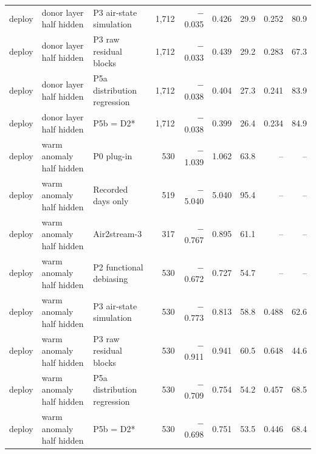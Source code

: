\begin{table}
{\begin{tabular}{lllrrrrrr}
deploy & donor layer half hidden & P3 air-state simulation & 1{,}712 & \ensuremath{-}0.035 & 0.426 & 29.9 & 0.252 & 80.9 \\
deploy & donor layer half hidden & P3 raw residual blocks & 1{,}712 & \ensuremath{-}0.033 & 0.439 & 29.2 & 0.283 & 67.3 \\
deploy & donor layer half hidden & P5a distribution regression & 1{,}712 & \ensuremath{-}0.038 & 0.404 & 27.3 & 0.241 & 83.9 \\
deploy & donor layer half hidden & P5b = D2* & 1{,}712 & \ensuremath{-}0.038 & 0.399 & 26.4 & 0.234 & 84.9 \\
deploy & warm anomaly half hidden & P0 plug-in & 530 & \ensuremath{-}1.039 & 1.062 & 63.8 & -- & -- \\
deploy & warm anomaly half hidden & Recorded days only & 519 & \ensuremath{-}5.040 & 5.040 & 95.4 & -- & -- \\
deploy & warm anomaly half hidden & Air2stream-3 & 317 & \ensuremath{-}0.767 & 0.895 & 61.1 & -- & -- \\
deploy & warm anomaly half hidden & P2 functional debiasing & 530 & \ensuremath{-}0.672 & 0.727 & 54.7 & -- & -- \\
deploy & warm anomaly half hidden & P3 air-state simulation & 530 & \ensuremath{-}0.773 & 0.813 & 58.8 & 0.488 & 62.6 \\
deploy & warm anomaly half hidden & P3 raw residual blocks & 530 & \ensuremath{-}0.911 & 0.941 & 60.5 & 0.648 & 44.6 \\
deploy & warm anomaly half hidden & P5a distribution regression & 530 & \ensuremath{-}0.709 & 0.754 & 54.2 & 0.457 & 68.5 \\
deploy & warm anomaly half hidden & P5b = D2* & 530 & \ensuremath{-}0.698 & 0.751 & 53.5 & 0.446 & 68.4 \\
\bottomrule
\end{tabular}
}
\end{table}

